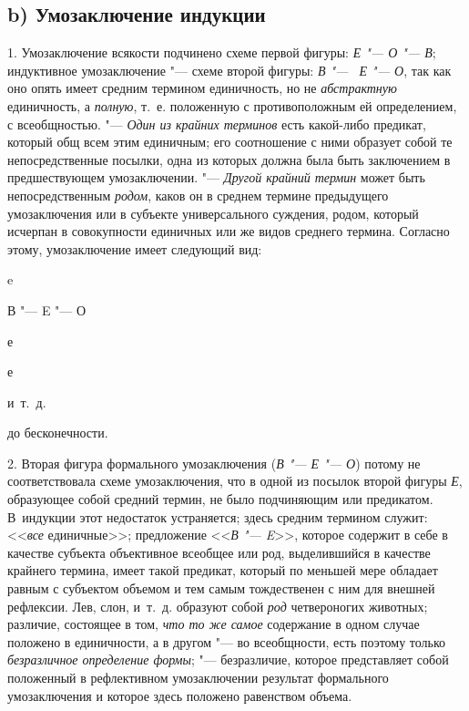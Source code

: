 \subsection[b) Умозаключение индукции]{b) Умозаключение индукции }
1. Умозаключение всякости подчинено схеме первой фигуры:
{\em Е "--- О
"--- В}; индуктивное умозаключение
"--- схеме второй фигуры:
{\em В "--- ~Е
"--- О}, так как оно опять имеет средним термином
единичность, но не {\em абстрактную}
единичность, а
{\em полную}, т.~е.
положенную с противоположным ей определением, с всеобщностью. "---
{\em Один из крайних терминов}
есть какой-либо предикат, который общ всем этим единичным;
его соотношение с ними образует собой те непосредственные посылки, одна из
которых должна была быть заключением в предшествующем умозаключении. "---
{\em Другой крайний термин}
может быть непосредственным
{\em родом}, каков он в
среднем термине предыдущего умозаключения или в субъекте универсального
суждения, родом, который исчерпан в совокупности единичных или же видов
среднего термина. Согласно этому, умозаключение имеет следующий вид:

{\centering
e
\par}

{\centering
В "--- E "--- О
\par}

{\centering
е
\par}

{\centering
е
\par}

{\centering
и~т.~д.
\par}

{\centering
до бесконечности.
\par}

2. Вторая фигура формального умозаключения
({\em В "--- Е "--- О}) потому не соответствовала схеме
умозаключения, что в одной из посылок второй фигуры
{\em Е}, образующее собой
средний термин, не было подчиняющим или предикатом. В~индукции этот
недостаток устраняется; здесь средним термином служит:
<<{\em все} единичные>>;
предложение <<{\em В
"--- E}>>,
которое содержит в себе в качестве субъекта объективное
всеобщее или род, выделившийся в качестве крайнего термина, имеет такой
предикат, который по меньшей мере обладает равным с субъектом объемом и тем
самым тождественен с ним для внешней рефлексии. Лев, слон, и~т.~д. образуют
собой {\em род}
четвероногих животных; различие, состоящее в том,
{\em что то же самое}
содержание в одном случае положено в единичности, а в другом
"--- во всеобщности, есть поэтому только
{\em безразличное определение формы};
"--- безразличие, которое представляет собой положенный в
рефлективном умозаключении результат формального умозаключения и которое
здесь положено равенством объема.


